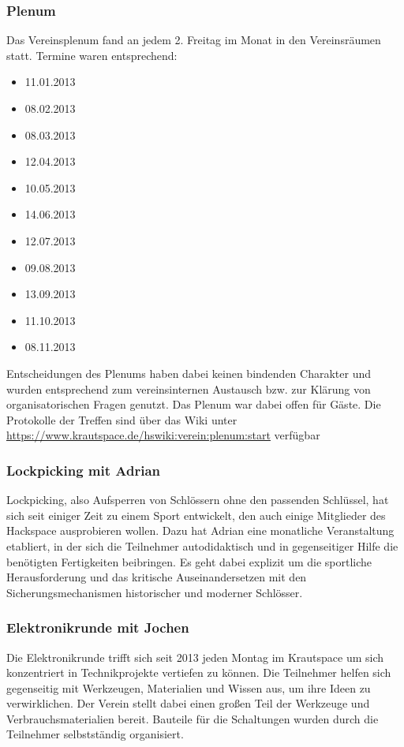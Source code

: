 \documentclass[10pt,DIV16]{scrartcl}
\begin{document}
\subsubsection{Plenum}

Das Vereinsplenum fand an jedem 2. Freitag im Monat in den
Vereinsräumen statt. Termine waren entsprechend:

\begin{itemize}
	\item 11.01.2013
	\item 08.02.2013
	\item 08.03.2013
	\item 12.04.2013
	\item 10.05.2013
	\item 14.06.2013
	\item 12.07.2013
	\item 09.08.2013
	\item 13.09.2013
	\item 11.10.2013
	\item 08.11.2013
\end{itemize}

Entscheidungen des Plenums haben dabei keinen bindenden Charakter und
wurden entsprechend zum vereinsinternen Austausch bzw. zur Klärung von
organisatorischen Fragen genutzt. Das Plenum war dabei offen für Gäste.
Die Protokolle der Treffen sind über das Wiki unter
\url{https://www.krautspace.de/hswiki:verein:plenum:start} verfügbar


\subsubsection{Lockpicking mit Adrian}

Lockpicking, also Aufsperren von Schlössern ohne den passenden
Schlüssel, hat sich seit einiger Zeit zu einem Sport entwickelt, den
auch einige Mitglieder des Hackspace ausprobieren wollen. Dazu hat
Adrian eine monatliche Veranstaltung etabliert, in der sich die Teilnehmer
autodidaktisch und in gegenseitiger Hilfe die benötigten Fertigkeiten
beibringen. Es geht dabei explizit um die sportliche Herausforderung
und das kritische Auseinandersetzen mit den Sicherungsmechanismen
historischer und moderner Schlösser.

\subsubsection{Elektronikrunde mit Jochen}

Die Elektronikrunde trifft sich seit 2013 jeden Montag im Krautspace um
sich konzentriert in Technikprojekte vertiefen zu können. Die
Teilnehmer helfen sich gegenseitig mit Werkzeugen, Materialien und
Wissen aus, um ihre Ideen zu verwirklichen. Der Verein stellt dabei
einen großen Teil der Werkzeuge und Verbrauchsmaterialien bereit.
Bauteile für die Schaltungen wurden durch die Teilnehmer selbstständig
organisiert.
\end{document}

